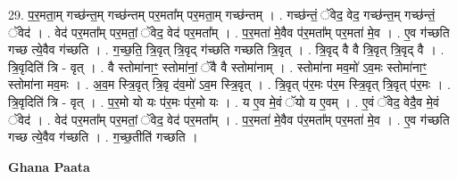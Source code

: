 \documentclass[17pt]{extarticle}
\begin{document}
29. प॒र॒मता॒म् गच्छ॑न्त॒म् गच्छ॑न्तम् पर॒मता᳚म् पर॒मता॒म् गच्छ॑न्तम् । . गच्छ॑न्तं॒ ॅवेद॒ वेद॒ गच्छ॑न्त॒म् गच्छ॑न्तं॒ ॅवेद॑ । . वेद॑ पर॒मता᳚म् पर॒मतां॒ ॅवेद॒ वेद॑ पर॒मता᳚म् । . प॒र॒मता॑ मे॒वैव प॑र॒मता᳚म् पर॒मता॑ मे॒व । . ए॒व ग॑च्छति गच्छ त्ये॒वैव ग॑च्छति । . ग॒च्छ॒ति॒ त्रि॒वृत् त्रि॒वृद् ग॑च्छति गच्छति त्रि॒वृत् । . त्रि॒वृद् वै वै त्रि॒वृत् त्रि॒वृद् वै । . त्रि॒वृदिति॑ त्रि - वृत् । . वै स्तोमा॑नाꣳ॒॒ स्तोमा॑नां॒ ॅवै वै स्तोमा॑नाम् । . स्तोमा॑ना मव॒मो॑ ऽव॒मः स्तोमा॑नाꣳ॒॒ स्तोमा॑ना मव॒मः । . अ॒व॒म स्त्रि॒वृत् त्रि॒वृ द॑व॒मो॑ ऽव॒म स्त्रि॒वृत् । . त्रि॒वृत् प॑र॒मः प॑र॒म स्त्रि॒वृत् त्रि॒वृत् प॑र॒मः । . त्रि॒वृदिति॑ त्रि - वृत् । . प॒र॒मो यो यः प॑र॒मः प॑र॒मो यः । . य ए॒व मे॒वं ॅयो य ए॒वम् । . ए॒वं ॅवेद॒ वेदै॒व मे॒वं ॅवेद॑ । . वेद॑ पर॒मता᳚म् पर॒मतां॒ ॅवेद॒ वेद॑ पर॒मता᳚म् । . प॒र॒मता॑ मे॒वैव प॑र॒मता᳚म् पर॒मता॑ मे॒व । . ए॒व ग॑च्छति गच्छ त्ये॒वैव ग॑च्छति । . ग॒च्छ॒तीति॑ गच्छति । \newline

\textbf{Ghana Paata } \newline
\end{document}
